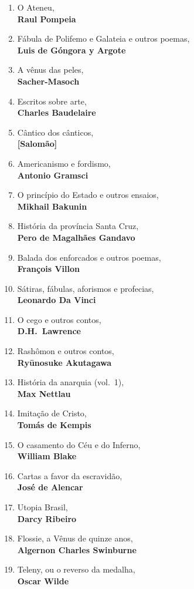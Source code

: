 \begin{enumerate} [font=\Formular\scriptsize]
\item O Ateneu,\\ \textbf{Raul Pompeia}
\item Fábula de Polifemo e Galateia e outros poemas,\\ \textbf{Luis de Góngora y Argote}
\item A vênus das peles,\\ \textbf{Sacher-Masoch}
\item Escritos sobre arte,\\ \textbf{Charles Baudelaire}
\item Cântico dos cânticos,\\ \textbf{{[}Salomão{]}}
\item Americanismo e fordismo,\\ \textbf{Antonio Gramsci}
\item O princípio do Estado e outros ensaios,\\ \textbf{Mikhail Bakunin}
\item História da província Santa Cruz,\\ \textbf{Pero de Magalhães Gandavo}
\item Balada dos enforcados e outros poemas,\\ \textbf{François Villon}
\item Sátiras, fábulas, aforismos e profecias,\\ \textbf{Leonardo Da Vinci}
\item O cego e outros contos,\\ \textbf{D.H.~Lawrence}
\item Rashômon e outros contos,\\ \textbf{Ryūnosuke Akutagawa}
\item História da anarquia (vol.~1),\\ \textbf{Max Nettlau}
\item Imitação de Cristo,\\ \textbf{Tomás de Kempis}
\item O casamento do Céu e do Inferno,\\ \textbf{William Blake}
\item Cartas a favor da escravidão,\\ \textbf{José de Alencar}
\item Utopia Brasil,\\ \textbf{Darcy Ribeiro}
\item Flossie, a Vênus de quinze anos,\\ \textbf{Algernon Charles Swinburne}
\item Teleny, ou o reverso da medalha,\\ \textbf{Oscar Wilde}

\end{enumerate}
